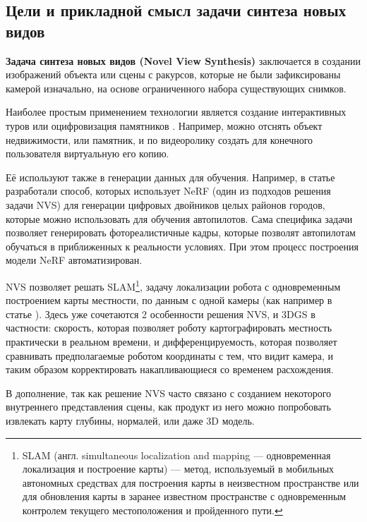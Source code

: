 \subsection{Цели и прикладной смысл задачи синтеза новых видов}

\textbf{Задача синтеза новых видов (Novel View Synthesis)} заключается в создании изображений объекта или сцены с ракурсов, которые не были зафиксированы камерой изначально, на основе ограниченного набора существующих снимков.

Наиболее простым применением технологии является создание интерактивных туров или оцифровизация памятников \cite{11268436}. Например, можно отснять объект недвижимости, или памятник, и по видеоролику создать для конечного пользователя виртуальную его копию.

Её используют также в генерации данных для обучения. Например, в статье \cite{tancik2022blocknerfscalablelargescene} разработали способ, которых использует NeRF (один из подходов решения задачи NVS) для генерации цифровых двойников целых районов городов, которые можно использовать для обучения автопилотов. Сама специфика задачи позволяет генерировать фотореалистичные кадры, которые позволят автопилотам обучаться в приближенных к реальности условиях. При этом процесс построения модели NeRF автоматизирован.

NVS позволяет решать SLAM\footnote{SLAM \cite{slam} (англ. simultaneous localization and mapping — одновременная локализация и построение карты) — метод, используемый в мобильных автономных средствах для построения карты в неизвестном пространстве или для обновления карты в заранее известном пространстве с одновременным контролем текущего местоположения и пройденного пути.}, задачу локализации робота с одновременным построением карты местности, по данным с одной камеры (как например в статье \cite{matsuki2024gaussiansplattingslam}). Здесь уже сочетаются 2 особенности решения NVS, и 3DGS в частности: скорость, которая позволяет роботу картографировать местность практически в реальном времени, и дифференцируемость, которая позволяет сравнивать предполагаемые роботом координаты с тем, что видит камера, и таким образом корректировать накапливающиеся со временем расхождения.

В дополнение, так как решение NVS часто связано с созданием некоторого внутреннего представления сцены, как продукт из него можно попробовать извлекать карту глубины, нормалей, или даже 3D модель.